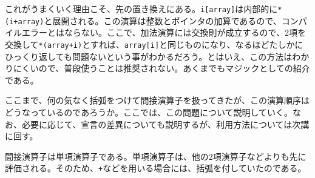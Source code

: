 これがうまくいく理由こそ、先の置き換えにある。\verb|i[array]|は内部的に\verb|*(i+array)|と展開される。この演算は整数とポインタの加算であるので、コンパイルエラーとはならない。ここで、加法演算には交換則が成立するので、2項を交換して\verb|*(array+i)|とすれば、\verb|array[i]|と同じものになり、なるほどたしかにひっくり返しても問題ないという事がわかるだろう。とはいえ、この方法はわかりにくいので、普段使うことは推奨されない。あくまでもマジックとしての紹介である。

ここまで、何の気なく括弧をつけて間接演算子を扱ってきたが、この演算順序はどうなっているのであろうか。ここでは、この問題について説明していく。なお、必要に応じて、宣言の差異についても説明するが、利用方法については次講に回す。

間接演算子は単項演算子である。単項演算子は、他の2項演算子などよりも先に評価される。そのため、\verb|+|などを用いる場合には、括弧を付していたのである。

